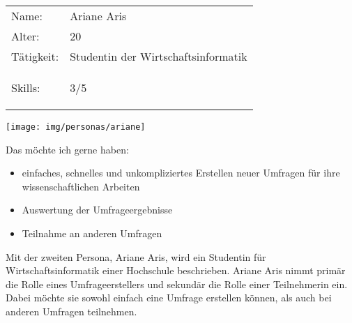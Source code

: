 
\newcommand{\ariane}{Ariane Aris\xspace}
%
\newpage
\cvsect{\ariane}
\begin{minipage}[t]{0.5\textwidth}
	\vspace{-3.6cm}
	\renewcommand{\arraystretch}{1.5}
	\begin{tabular}{l l}
		Name: & \ariane \\
		Alter: & 20 \\
		Tätigkeit: & Studentin der Wirtschaftsinformatik \\
		Skills: & 3/5 \hspace{-1cm} \begin{barchart}{5.0}
			\baritemNL{}{3}
		\end{barchart} \\
	\end{tabular}
\end{minipage}
\hfill
\begin{minipage}[t]{0.4\textwidth}
	\flushright
	\texttt{[image: img/personas/ariane]}
\end{minipage}
\autocite{rf-unsplash-studentin}

Das möchte ich gerne haben:
\begin{itemize}
	\item einfaches, schnelles und unkompliziertes Erstellen neuer Umfragen für ihre wissenschaftlichen Arbeiten
	\item Auswertung der Umfrageergebnisse
    \item Teilnahme an anderen Umfragen
\end{itemize}

Mit der zweiten Persona, \ariane, wird ein Studentin für Wirtschaftsinformatik einer Hochschule beschrieben.
\ariane nimmt primär die Rolle eines Umfrageerstellers und sekundär die Rolle einer Teilnehmerin ein.
Dabei möchte sie sowohl einfach eine Umfrage erstellen können, als auch bei anderen Umfragen teilnehmen.